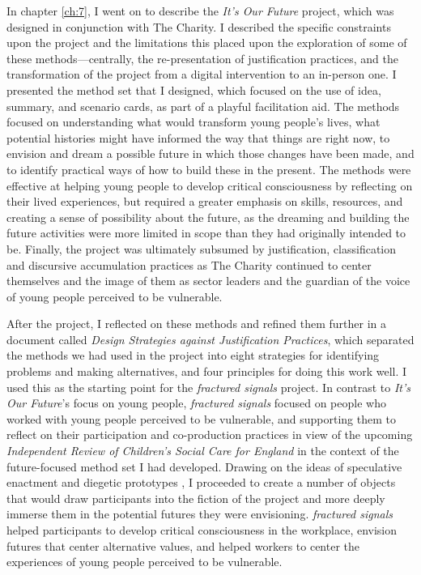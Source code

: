 In chapter \ref{ch:7}, I went on to describe the \textit{It's Our Future} project, which was designed in conjunction with The Charity. I described the specific constraints upon the project and the limitations this placed upon the exploration of some of these methods—centrally, the re-presentation of justification practices, and the transformation of the project from a digital intervention to an in-person one. I presented the method set that I designed, which focused on the use of idea, summary, and scenario cards, as part of a playful facilitation aid. The methods focused on understanding what would transform young people's lives,  what potential histories might have informed the way that things are right now, to envision and dream a possible future in which those changes have been made, and to identify practical ways of how to build these in the present. The methods were effective at helping young people to develop critical consciousness by reflecting on their lived experiences, but required a greater emphasis on skills, resources, and  creating a sense of possibility about the future, as the dreaming and building the future activities were more limited in scope than they had originally intended to be. Finally, the project was ultimately subsumed by justification, classification and discursive accumulation practices as The Charity continued to center themselves and the image of them as sector leaders and the guardian of the voice of young people perceived to be vulnerable.

After the project, I reflected on these methods and refined them further in a document called \textit{Design Strategies against Justification Practices}, which separated the methods we had used in the project into eight strategies for identifying problems and making alternatives, and four principles for doing this work well. I used this as the starting point for the \textit{fractured signals} project. In contrast to \textit{It's Our Future}'s focus on young people, \textit{fractured signals} focused on people who worked with young people perceived to be vulnerable, and supporting them to reflect on their participation and co-production practices in view of the upcoming \textit{Independent Review of Children's Social Care for England} in the context of the future-focused method set I had developed. Drawing on the ideas of speculative enactment \citep{elsden_speculative_2017} and diegetic prototypes \citep{kirby_future_2010}, I proceeded to create a number of objects that would draw participants into the fiction of the project and more deeply immerse them in the potential futures they were envisioning. \textit{fractured signals} helped participants to develop critical consciousness in the workplace, envision futures that center alternative values, and helped workers to center the experiences of young people perceived to be vulnerable. 

